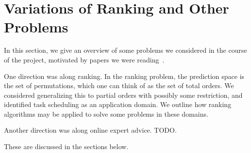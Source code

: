 \section{Variations of Ranking and Other Problems}\label{sec:problems}
In this section, we give an overview of some problems we considered in the
course of the project, motivated by papers we were reading~\cite{}. 

One direction was along ranking. In the ranking problem, the prediction space
is the set of permutations, which one can think of as the set of total orders.
We considered generalizing this to partial orders with possibly some
restriction, and identified task scheduling as an application domain.
We outline how ranking algorithms may be applied to solve some
problems in these domains.

Another direction was along online expert advice.
TODO.

These are discussed in the sections below.

